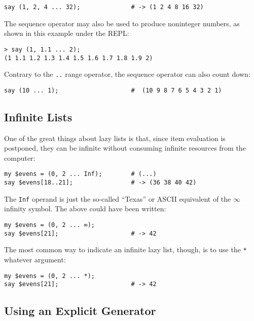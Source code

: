 \begin{verbatim}
say (1, 2, 4 ... 32);              # -> (1 2 4 8 16 32)
\end{verbatim}

The sequence operator may also be used to produce noninteger 
numbers, as shown in this example under the REPL:

\begin{verbatim}
> say (1, 1.1 ... 2);
(1 1.1 1.2 1.3 1.4 1.5 1.6 1.7 1.8 1.9 2)
\end{verbatim}

Contrary to the \verb'..' range operator, the sequence 
operator can also count down:

\begin{verbatim}
say (10 ... 1);                    #  (10 9 8 7 6 5 4 3 2 1)
\end{verbatim}

\subsection{Infinite Lists}

One of the great things about lazy lists is that, since 
item evaluation is postponed, they can be infinite without 
consuming infinite resources from the computer:

\begin{verbatim}
my $evens = (0, 2 ... Inf);        # (...)
say $evens[18..21];                # -> (36 38 40 42)
\end{verbatim}

The {\tt Inf} operand is just the so-called ``Texas'' 
or ASCII equivalent of the $\infty$ infinity symbol. 
The above could have been written:

\begin{verbatim}
my $evens = (0, 2 ... ∞); 
say $evens[21];                    # -> 42
\end{verbatim} 

The most common way to indicate an infinite lazy list, though, 
is to use the \verb'*' whatever argument:

\begin{verbatim}
my $evens = (0, 2 ... *); 
say $evens[21];                    # -> 42
\end{verbatim} 

\subsection{Using an Explicit Generator}

